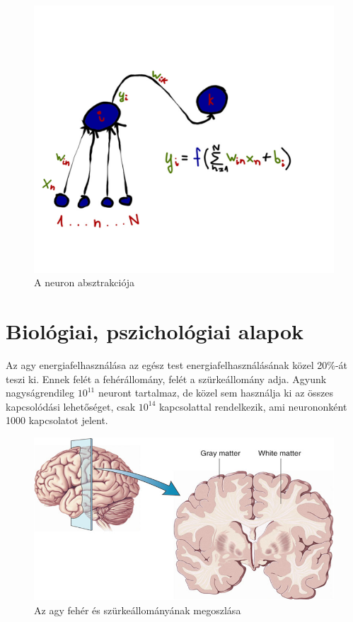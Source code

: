 \documentclass{article}
\begin{document}
\begin{figure}[h!]
\centering
\includegraphics[width=\textwidth,height=\textheight,keepaspectratio]{abstractneuron.png}
\caption{A neuron absztrakciója}
\label{fig:abstractneuron}
\end{figure}

\section{Biológiai, pszichológiai alapok}
Az agy energiafelhasználása az egész test energiafelhasználásának közel 20\%-át teszi ki. Ennek felét a fehérállomány, felét a szürkeállomány adja. Agyunk nagyságrendileg $10^{11}$ neuront tartalmaz, de közel sem használja ki az összes kapcsolódási lehetőséget, csak $10^{14}$ kapcsolattal rendelkezik, ami neurononként 1000 kapcsolatot jelent. \newline

\begin{figure}[h!]
\centering
\includegraphics[width=\textwidth,height=\textheight,keepaspectratio]{brain.png}
\caption{Az agy fehér és szürkeállományának megoszlása}
\label{fig:brain}
\end{figure}
\end{document}
